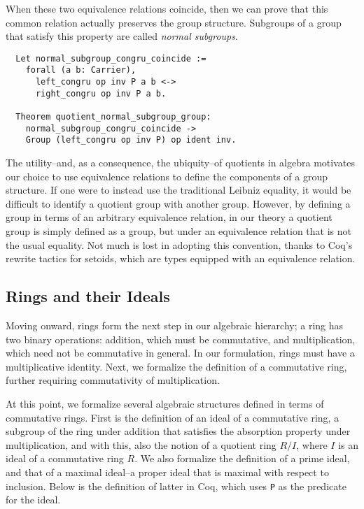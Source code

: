 \documentclass{article}
\begin{document}
When these two equivalence relations coincide, then we can prove that this common
 relation actually preserves the group structure. Subgroups of a group that satisfy 
this property are called \emph{normal subgroups}.

\begin{verbatim}
  Let normal_subgroup_congru_coincide :=
    forall (a b: Carrier),
      left_congru op inv P a b <->
      right_congru op inv P a b.

  Theorem quotient_normal_subgroup_group:
    normal_subgroup_congru_coincide ->
    Group (left_congru op inv P) op ident inv.
\end{verbatim}

The utility--and, as a consequence, the ubiquity--of quotients in algebra 
motivates our choice to use equivalence relations to define the components of a group structure. If one
were to instead use the traditional Leibniz equality, it would be difficult to
identify a quotient group with another group. However, by  defining a group in
terms of an arbitrary equivalence relation, in our theory a quotient group is 
simply defined as a group, but under an equivalence relation that is not the
usual equality. Not much is lost in adopting this convention, thanks to Coq's 
rewrite tactics for setoids, which are types equipped with an equivalence relation. 

\subsection{Rings and their Ideals}
Moving onward, rings form the next step in our algebraic hierarchy; a ring has
two binary operations: addition, which must be commutative, and multiplication,
which need not be commutative in general. In our formulation, rings must have a
multiplicative identity. Next, we formalize the definition of a commutative
ring, further requiring commutativity of multiplication.  

At this point, we formalize several algebraic structures defined in terms of commutative rings.
First is the definition of an ideal of a commutative ring, a subgroup of the ring
under addition that satisfies the absorption property under multiplication, and with this, also the 
notion of a quotient ring $R/I$, where $I$ is an ideal of a commutative ring
$R$.
We also formalize the definition of a  prime ideal, and that of a maximal ideal--a proper ideal that is maximal with respect to inclusion.
 Below is the definition of latter in Coq,
which uses \texttt{P} as the predicate for the ideal.
\end{document}
